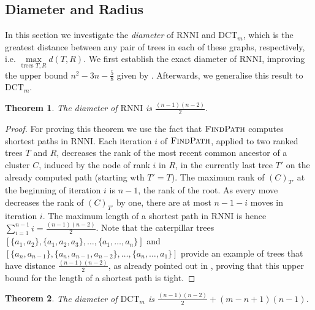 \documentclass[11pt]{amsart}
\newtheorem{theorem}{Theorem}
\newcommand{\rnni}{\mathrm{RNNI}}
\newcommand{\findpath}{\textsc{FindPath}}
\newcommand{\dtt}{\mathrm{DCT}}
\newcommand{\summary}[1]{} %
\begin{document}
\subsection{Diameter and Radius}

\label{section:diameter}
\summary{Definition of Diameter.}
In this section we  investigate the \emph{diameter} of $\rnni$ and $\dtt_m$, which is the greatest distance between any pair of trees in each of these graphs, respectively, i.e. $\max\limits_{\text{trees }T,R}d(T,R)$.
We first establish the exact diameter of $\rnni$, improving the upper bound $n^2 - 3n - \frac{5}{8}$ given by \textcite{Gavryushkin2018-ol}.
Afterwards, we generalise this result to $\dtt_m$.

\begin{theorem}
	The diameter of $\rnni$ is $\frac{(n-1)(n-2)}{2}$.
	\label{thm:diameter_rnni}
\end{theorem}

\begin{proof}
	For proving this theorem we use the fact that $\findpath$ computes shortest paths in $\rnni$.
	Each iteration $i$ of $\findpath$, applied to two ranked trees $T$ and $R$, decreases the rank of the most recent common ancestor of a cluster $C$, induced by the node of rank $i$ in $R$, in the currently last tree $T'$ on the already computed path (starting wth $T' = T$).
	The maximum rank of $(C)_{T'}$ at the beginning of iteration $i$ is $n-1$, the rank of the root.
	As every move decreases the rank of $(C)_{T'}$ by one, there are at most $n-1-i$ moves in iteration $i$.
	The maximum length of a shortest path in $\rnni$ is hence $\sum \limits_{i = 1}^{n-1} i = \frac{(n-1)(n-2)}{2}$.
	Note that the caterpillar trees $[\{a_1, a_2\}, \{a_1, a_2, a_3\}, \ldots, \{a_1, \ldots, a_n\}]$ and $[\{a_n, a_{n-1}\}, \{a_n, a_{n-1}, a_{n-2}\}, \ldots, \{a_n, \ldots, a_1\}]$ provide an example of trees that have distance $\frac{(n-1)(n-2)}{2}$, as already pointed out in \autocite[Corollary 1]{Collienne2020-iu}, proving that this upper bound for the length of a shortest path is tight.
\end{proof}

\begin{theorem}
	The diameter of $\dtt_m$ is $\frac{(n-1)(n-2)}{2} + (m-n+1)(n-1)$.
	\label{thm:dtt_diameter}
\end{theorem}
\end{document}
